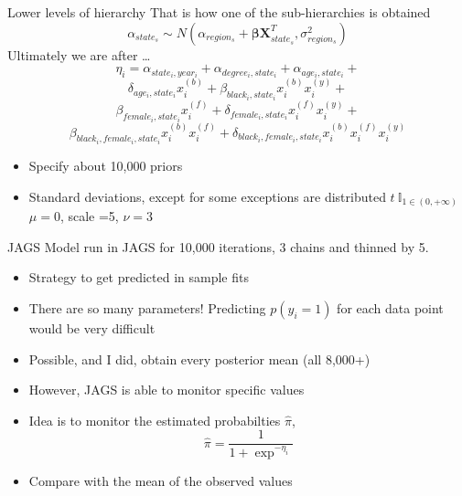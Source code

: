 \documentclass{beamer}
\begin{document}
	\begin{frame}{Lower levels of hierarchy}
		That is how one of the sub-hierarchies is obtained
			\[
			\alpha_{state_s} \sim N(\alpha_{region_s} + \bm{\beta X}^{T}_{state_s}, \sigma^2_{region_s}   )
			\]
			Ultimately we are after \dots
						 $$ \eta_i = \alpha_{state_i, year_i} + \alpha_{degree_i, state_i} + \alpha_{age_i, state_i} +  $$
						 $$ \delta_{age_i, state_i}x^{(b)}_i + \beta_{black_i, state_i}x^{(b)}_ix^{(y)}_i  + $$
						 $$ \beta_{female_i, state_i} x^{(f)}_i +  \delta_{female_i, state_i}x^{(f)}_ix^{(y)}_i  + $$ 
						 $$ \beta_{black_i, female_i, state_i}x^{(b)}_ix^{(f)}_i + \delta_{black_i, female_i, state_i}x^{(b)}_ix^{(f)}_ix^{(y)}_i $$
		\begin{itemize}
			\item Specify about 10,000 priors 
			\item Standard deviations, except for some exceptions are distributed $ t  \ \mathbb{I}_{1\in(0,+\infty)} $ $ \mu=0 $, scale =5, $ \nu =3 $ 
		\end{itemize}
		\end{frame}
	\begin{frame}{JAGS}
		Model run in JAGS for 10,000 iterations, 3 chains and thinned by 5. 
		\begin{itemize}
			\item Strategy to get predicted in sample fits
			\item There are so many parameters! Predicting $ p(y_i =1) $ for each data point would be very difficult
			\item Possible, and I did, obtain every posterior mean (all 8,000+)
			\item However, JAGS is able to monitor specific values
			\item Idea is to monitor the estimated probabilties $ \hat{\pi} $, 
			\[
			\hat{\pi} = \frac{1}{1 + \exp^{-\eta_i} }
			\]
			\item Compare with the mean of the observed values
		\end{itemize}
	\end{frame}
	
\end{document}
